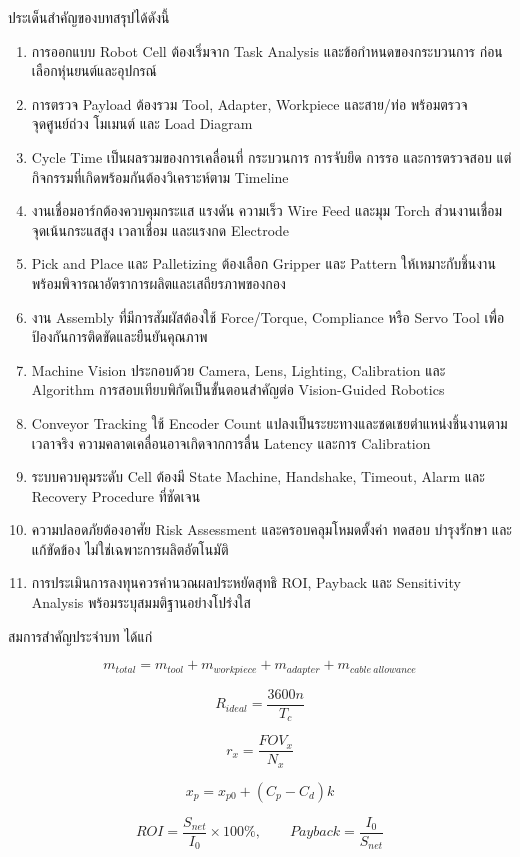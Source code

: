 ประเด็นสำคัญของบทสรุปได้ดังนี้

\begin{enumerate}
    \item การออกแบบ Robot Cell ต้องเริ่มจาก Task Analysis และข้อกำหนดของกระบวนการ ก่อนเลือกหุ่นยนต์และอุปกรณ์
    \item การตรวจ Payload ต้องรวม Tool, Adapter, Workpiece และสาย/ท่อ พร้อมตรวจจุดศูนย์ถ่วง โมเมนต์ และ Load Diagram
    \item Cycle Time เป็นผลรวมของการเคลื่อนที่ กระบวนการ การจับยึด การรอ และการตรวจสอบ แต่กิจกรรมที่เกิดพร้อมกันต้องวิเคราะห์ตาม Timeline
    \item งานเชื่อมอาร์กต้องควบคุมกระแส แรงดัน ความเร็ว Wire Feed และมุม Torch ส่วนงานเชื่อมจุดเน้นกระแสสูง เวลาเชื่อม และแรงกด Electrode
    \item Pick and Place และ Palletizing ต้องเลือก Gripper และ Pattern ให้เหมาะกับชิ้นงาน พร้อมพิจารณาอัตราการผลิตและเสถียรภาพของกอง
    \item งาน Assembly ที่มีการสัมผัสต้องใช้ Force/Torque, Compliance หรือ Servo Tool เพื่อป้องกันการติดขัดและยืนยันคุณภาพ
    \item Machine Vision ประกอบด้วย Camera, Lens, Lighting, Calibration และ Algorithm การสอบเทียบพิกัดเป็นขั้นตอนสำคัญต่อ Vision-Guided Robotics
    \item Conveyor Tracking ใช้ Encoder Count แปลงเป็นระยะทางและชดเชยตำแหน่งชิ้นงานตามเวลาจริง ความคลาดเคลื่อนอาจเกิดจากการลื่น Latency และการ Calibration
    \item ระบบควบคุมระดับ Cell ต้องมี State Machine, Handshake, Timeout, Alarm และ Recovery Procedure ที่ชัดเจน
    \item ความปลอดภัยต้องอาศัย Risk Assessment และครอบคลุมโหมดตั้งค่า ทดสอบ บำรุงรักษา และแก้ขัดข้อง ไม่ใช่เฉพาะการผลิตอัตโนมัติ
    \item การประเมินการลงทุนควรคำนวณผลประหยัดสุทธิ ROI, Payback และ Sensitivity Analysis พร้อมระบุสมมติฐานอย่างโปร่งใส
\end{enumerate}

สมการสำคัญประจำบท ได้แก่

\[
m_{total}=m_{tool}+m_{workpiece}+m_{adapter}+m_{cable\ allowance}
\]

\[
R_{ideal}=\frac{3600n}{T_c}
\]

\[
r_x=\frac{FOV_x}{N_x}
\]

\[
x_p=x_{p0}+(C_p-C_d)k
\]

\[
ROI=\frac{S_{net}}{I_0}\times100\%,\qquad
Payback=\frac{I_0}{S_{net}}
\]



